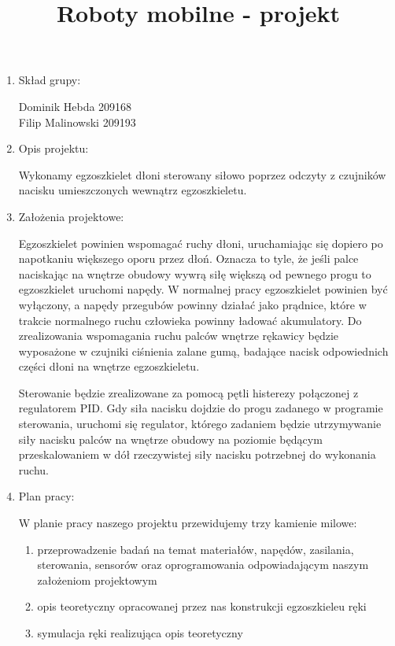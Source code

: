 \documentclass[a4paper]{article}
\title{Roboty mobilne - projekt}
\date{}
\begin{document}
\maketitle

\begin{enumerate}

\item Skład grupy:

Dominik Hebda 209168 \\
Filip Malinowski 209193

\item Opis projektu:

Wykonamy egzoszkielet dłoni sterowany siłowo poprzez odczyty z czujników nacisku umieszczonych wewnątrz egzoszkieletu.

\item Założenia projektowe:

Egzoszkielet powinien wspomagać ruchy dłoni, uruchamiając się dopiero po napotkaniu większego oporu przez dłoń. Oznacza to tyle, że jeśli palce naciskając na wnętrze obudowy wywrą siłę większą od pewnego progu to egzoszkielet uruchomi napędy. W normalnej pracy egzoszkielet powinien być wyłączony, a napędy przegubów powinny działać jako prądnice, które w trakcie normalnego ruchu człowieka powinny ładować akumulatory.
Do zrealizowania wspomagania ruchu palców wnętrze rękawicy będzie wyposażone w czujniki ciśnienia zalane gumą, badające nacisk odpowiednich części dłoni na wnętrze egzoszkieletu.

Sterowanie będzie zrealizowane za pomocą pętli histerezy połączonej z regulatorem PID. Gdy siła nacisku dojdzie do progu zadanego w programie sterowania, uruchomi się regulator, którego zadaniem będzie utrzymywanie siły nacisku palców na wnętrze obudowy na poziomie będącym przeskalowaniem w dół rzeczywistej siły nacisku potrzebnej do wykonania ruchu.

\item Plan pracy:

W planie pracy naszego projektu przewidujemy trzy kamienie milowe:
\begin{enumerate}[I -]
\item przeprowadzenie badań na temat materiałów, napędów, zasilania, sterowania, sensorów oraz oprogramowania odpowiadającym naszym założeniom projektowym
\item opis teoretyczny opracowanej przez nas konstrukcji egzoszkieleu ręki
\item symulacja ręki realizująca opis teoretyczny
\end{enumerate}


\end{enumerate}
\end{document}
